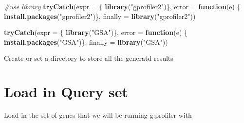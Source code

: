 \documentclass[
]{book}
\newenvironment{Shaded}{\begin{snugshade}}{\end{snugshade}}
\newcommand{\AttributeTok}[1]{\textcolor[rgb]{0.13,0.29,0.53}{#1}}
\newcommand{\CommentTok}[1]{\textcolor[rgb]{0.56,0.35,0.01}{\textit{#1}}}
\newcommand{\ConstantTok}[1]{\textcolor[rgb]{0.56,0.35,0.01}{#1}}
\newcommand{\ControlFlowTok}[1]{\textcolor[rgb]{0.13,0.29,0.53}{\textbf{#1}}}
\newcommand{\FunctionTok}[1]{\textcolor[rgb]{0.13,0.29,0.53}{\textbf{#1}}}
\newcommand{\NormalTok}[1]{#1}
\newcommand{\OtherTok}[1]{\textcolor[rgb]{0.56,0.35,0.01}{#1}}
\newcommand{\SpecialCharTok}[1]{\textcolor[rgb]{0.81,0.36,0.00}{\textbf{#1}}}
\newcommand{\StringTok}[1]{\textcolor[rgb]{0.31,0.60,0.02}{#1}}
\begin{document}
\begin{Shaded}
\begin{Highlighting}[]
\CommentTok{\#use library}
\FunctionTok{tryCatch}\NormalTok{(}\AttributeTok{expr =}\NormalTok{ \{ }\FunctionTok{library}\NormalTok{(}\StringTok{"gprofiler2"}\NormalTok{)\}, }
         \AttributeTok{error =} \ControlFlowTok{function}\NormalTok{(e) \{ }
           \FunctionTok{install.packages}\NormalTok{(}\StringTok{"gprofiler2"}\NormalTok{)\}, }
         \AttributeTok{finally =} \FunctionTok{library}\NormalTok{(}\StringTok{"gprofiler2"}\NormalTok{))}

\FunctionTok{tryCatch}\NormalTok{(}\AttributeTok{expr =}\NormalTok{ \{ }\FunctionTok{library}\NormalTok{(}\StringTok{"GSA"}\NormalTok{)\}, }
         \AttributeTok{error =} \ControlFlowTok{function}\NormalTok{(e) \{ }
           \FunctionTok{install.packages}\NormalTok{(}\StringTok{"GSA"}\NormalTok{)\}, }
         \AttributeTok{finally =} \FunctionTok{library}\NormalTok{(}\StringTok{"GSA"}\NormalTok{))}
\end{Highlighting}
\end{Shaded}

Create or set a directory to store all the generatd results

\begin{Shaded}
\end{Shaded}

\hypertarget{load-in-query-set}{%
\section{Load in Query set}\label{load-in-query-set}}

Load in the set of genes that we will be running g:profiler with

\begin{Shaded}
\end{Shaded}
\end{document}
